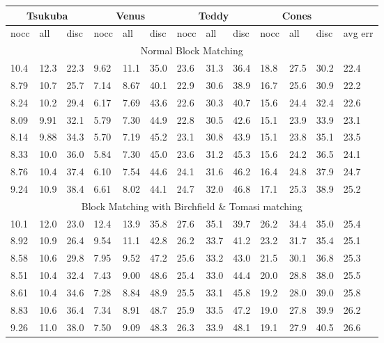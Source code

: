 \begin{tabular}{|l|l|l||l|l|l||l|l|l||l|l|l||l|}
  \hline
  \multicolumn{3}{|c||}{Tsukuba} &
  \multicolumn{3}{c||}{Venus} &
  \multicolumn{3}{c||}{Teddy} &
  \multicolumn{3}{c||}{Cones} & ~ \\
  \hline
  nocc & all & disc & nocc & all & disc & nocc & all & disc & nocc & all & disc & avg err\\
  \hline
  \multicolumn{13}{|c|}{Normal Block Matching} \\
  \hline
  10.4 & 12.3 & 22.3 & 9.62 & 11.1 & 35.0 & 23.6 & 31.3 & 36.4 & 18.8 & 27.5 & 30.2 & 22.4 \\
  8.79 & 10.7 & 25.7 & 7.14 & 8.67 & 40.1 & 22.9 & 30.6 & 38.9 & 16.7 & 25.6 & 30.9 & 22.2 \\
  8.24 & 10.2 & 29.4 & 6.17 & 7.69 & 43.6 & 22.6 & 30.3 & 40.7 & 15.6 & 24.4 & 32.4 & 22.6 \\
  8.09 & 9.91 & 32.1 & 5.79 & 7.30 & 44.9 & 22.8 & 30.5 & 42.6 & 15.1 & 23.9 & 33.9 & 23.1 \\
  8.14 & 9.88 & 34.3 & 5.70 & 7.19 & 45.2 & 23.1 & 30.8 & 43.9 & 15.1 & 23.8 & 35.1 & 23.5 \\
  8.33 & 10.0 & 36.0 & 5.84 & 7.30 & 45.0 & 23.6 & 31.2 & 45.3 & 15.6 & 24.2 & 36.5 & 24.1 \\
  8.76 & 10.4 & 37.4 & 6.10 & 7.54 & 44.6 & 24.1 & 31.6 & 46.2 & 16.4 & 24.8 & 37.9 & 24.7 \\
  9.24 & 10.9 & 38.4 & 6.61 & 8.02 & 44.1 & 24.7 & 32.0 & 46.8 & 17.1 & 25.3 & 38.9 & 25.2 \\
  \hline
  \multicolumn{13}{|c|}{Block Matching with Birchfield \& Tomasi matching} \\
  \hline
  10.1 & 12.0 & 23.0 & 12.4 & 13.9 & 35.8 & 27.6 & 35.1 & 39.7 & 26.2 & 34.4 & 35.0 & 25.4 \\
  8.92 & 10.9 & 26.4 & 9.54 & 11.1 & 42.8 & 26.2 & 33.7 & 41.2 & 23.2 & 31.7 & 35.4 & 25.1 \\
  8.58 & 10.6 & 29.8 & 7.95 & 9.52 & 47.2 & 25.6 & 33.2 & 43.0 & 21.5 & 30.1 & 36.8 & 25.3 \\
  8.51 & 10.4 & 32.4 & 7.43 & 9.00 & 48.6 & 25.4 & 33.0 & 44.4 & 20.0 & 28.8 & 38.0 & 25.5 \\
  8.61 & 10.4 & 34.6 & 7.28 & 8.84 & 48.9 & 25.5 & 33.1 & 45.8 & 19.2 & 28.0 & 39.0 & 25.8 \\
  8.83 & 10.6 & 36.4 & 7.34 & 8.91 & 48.7 & 25.9 & 33.5 & 47.2 & 19.0 & 27.8 & 39.9 & 26.2 \\
  9.26 & 11.0 & 38.0 & 7.50 & 9.09 & 48.3 & 26.3 & 33.9 & 48.1 & 19.1 & 27.9 & 40.5 & 26.6 \\

\end{tabular}
